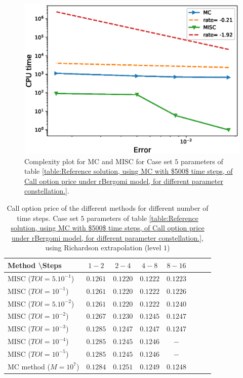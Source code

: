 \documentclass[11pt]{article}
\begin{document}
	\begin{figure}[h!]
	\centering
	\includegraphics[width=0.7\linewidth]{./figures/rBergomi_Complexity_rates/set5/error_vs_time_set5}

	\caption{Complexity plot for   MC and MISC for Case set $5$ parameters of table \ref{table:Reference solution, using MC with $500$ time steps, of Call option price under rBergomi model, for different parameter constellation.}.}
	\label{fig:Complexity plot for MC and MISC for Case set $5$ parameters}
\end{figure}
\FloatBarrier




\begin{table}[h!]
	\centering
	\begin{tabular}{l*{6}{c}r}
		Method \textbackslash  Steps    &$1-2$         & $2-4$ & $4-8$ & $8-16$\\
		\hline
		MISC ($TOl=5.10^{-1}$)   &$ 0.1261$ & $0.1220$ & $0.1222$ & $0.1223$\\
		MISC ($TOl=10^{-1}$)   &$ 0.1261$ & $0.1220$  &$0.1222$ & $0.1226$\\
		MISC ($TOl=5.10^{-2}$)   &$ 0.1261$ & $0.1220$  & $0.1222$ & $0.1240$ \\
		MISC ($TOl=10^{-2}$)   &$ 0.1267$ & $0.1230$ & $0.1245$ & $0.1247$  \\	
		MISC ($TOl=10^{-3}$)   &$0.1285$ & $0.1247$ & $0.1247$ &  $0.1247$ \\
		MISC ($TOl=10^{-4}$)  &$0.1285$ & $0.1245$ & $0.1246$ & $-$ \\
			MISC ($TOl=10^{-5}$)  &$0.1285$ & $0.1245$ &  $0.1246$ & $-$ \\
	
		\hline
		MC method ($M=10^{7}$)   & $     0.1284$  & $ 
		0.1251$  & $0.1249$ & $  0.1248$ \\		
		\hline
	\end{tabular}
	\caption{Call option price of the different methods for different number of time steps. Case set $5$ parameters of table \ref{table:Reference solution, using MC with $500$ time steps, of Call option price under rBergomi model, for different parameter constellation.}, using Richardson extrapolation (level $1$)}
	\label{table:  Call option price of the different methods for different number of time steps. Case set $5$ parameter, using Richardson extrapolation (level $1$)}
\end{table}
\end{document}
